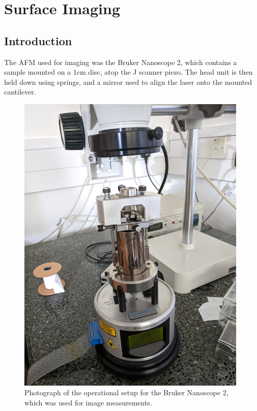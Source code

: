

\chapter{Surface Imaging}

\section{Introduction}

The AFM used for imaging was the Bruker Nanoscope 2, which contains a sample mounted on a 1cm disc, atop the J scanner piezo. The head unit is then held down using springs, and a mirror used to align the laser onto the mounted cantilever.



\begin{figure}[h!!!!!!!]     %
        \begin{center}
          \includegraphics[width=110mm]{chapter2/ImageAFM.jpg}
\end{center}
\caption{Photograph of the operational setup for the Bruker Nanoscope 2, which was used for image measurements.}
\label{fig:ImageAFM}                 %
\end{figure}

